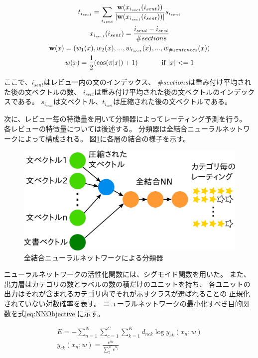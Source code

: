 \documentclass[twocolumn,a4paper]{ltjarticle}
\makeatletter
\let\tti@includegraphics\includegraphics
\renewcommand{\includegraphics}[1]{%
    \tti@includegraphics[width=\linewidth]{#1}}
\makeatother
\begin{document}
\begin{gather}
  t_{i_{sect}} = \sum_{i_{sent}} \frac{\mathbf{w}(x_{i_{sect}}(i_{sent}))}
                                      {|\mathbf{w}(x_{i_{sect}}(i_{sent}))|}
                                 s_{i_{sent}} \\
  x_{i_{sect}}(i_{sent}) = \frac{i_{sent} - i_{sect}}{\#sections} \\
  \mathbf{w}(x) = (w_{1}(x), w_{2}(x), ..., w_{i_{sect}}(x),
                   ..., w_{\#sentences}(x)) \\
  w(x) = \frac{1}{2} (\cos(\pi|x|) + 1) \hspace{8ex} \text{if $|x| <= 1$}
\end{gather}

ここで、$i_{sent}$はレビュー内の文のインデックス、
$\#sections$は重み付け平均された後の文ベクトルの数、
$i_{sect}$は重み付け平均された後の文ベクトルのインデックスである。
$s_{i_{sent}}$は文ベクトル、$t_{i_{sect}}$は圧縮された後の文ベクトルである。

次に、レビュー毎の特徴量を用いて分類器によってレーティング予測を行う。
各レビューの特徴量については後述する。
分類器は全結合ニューラルネットワークによって構成される。
図\ref{fig:MyModel}に各層の結合の様子を示す。

\begin{figure}
  \includegraphics{fig/model.png}
  \caption{全結合ニューラルネットワークによる分類器}
  \label{fig:MyModel}
\end{figure}

ニューラルネットワークの活性化関数には、シグモイド関数を用いた。
また、出力層はカテゴリの数とラベルの数の積だけのユニットを持ち、
各ユニットの出力はそれが含まれるカテゴリ内でそれが示すクラスが選ばれることの
正規化されていない対数確率を表す。
ニューラルネットワークの最小化すべき目的関数を式\ref{eq:NNObjective}に示す。

\begin{gather}
  E = - \sum^{N}_{n = 1} \sum^{C}_{c = 1} \sum^{K}_{k = 1}
        d_{nck} \log{y_{ck}(x_n; w)}
  \label{eq:NNObjective} \\
  y_{ck}(x_n; w) = \frac{e^{u_k}}{\sum^{K}_{j} e^{u_j}}
\end{gather}
\end{document}
